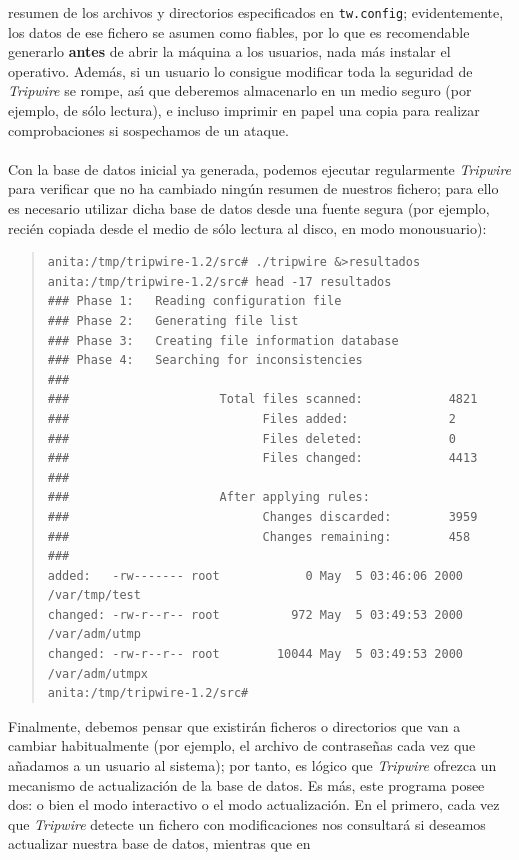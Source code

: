 resumen de los archivos y directorios especificados en {\tt tw.config}; 
evidentemente, los datos de ese fichero se asumen como fiables, por lo que 
es recomendable generarlo {\bf antes} de abrir la m\'aquina a los usuarios,
nada m\'as instalar el operativo. Adem\'as, si un usuario lo consigue modificar
toda la seguridad de {\it Tripwire} se rompe, as\'{\i} que deberemos almacenarlo
en un medio seguro (por ejemplo, de s\'olo lectura), e incluso imprimir en
papel una copia para realizar comprobaciones si sospechamos de un ataque.\\
\\Con la base de datos inicial ya generada, podemos ejecutar regularmente
{\it Tripwire} para verificar que no ha cambiado ning\'un resumen de nuestros
fichero; para ello es necesario utilizar dicha base de datos desde una fuente
segura (por ejemplo, reci\'en copiada desde el medio de s\'olo lectura al
disco, en modo monousuario):
\begin{quote}
\begin{verbatim}
anita:/tmp/tripwire-1.2/src# ./tripwire &>resultados
anita:/tmp/tripwire-1.2/src# head -17 resultados
### Phase 1:   Reading configuration file
### Phase 2:   Generating file list
### Phase 3:   Creating file information database
### Phase 4:   Searching for inconsistencies
###
###                     Total files scanned:            4821
###                           Files added:              2
###                           Files deleted:            0
###                           Files changed:            4413
###
###                     After applying rules:
###                           Changes discarded:        3959
###                           Changes remaining:        458
###
added:   -rw------- root            0 May  5 03:46:06 2000 /var/tmp/test
changed: -rw-r--r-- root          972 May  5 03:49:53 2000 /var/adm/utmp
changed: -rw-r--r-- root        10044 May  5 03:49:53 2000 /var/adm/utmpx
anita:/tmp/tripwire-1.2/src# 
\end{verbatim}
\end{quote}
Finalmente, debemos pensar que existir\'an ficheros o directorios que van a
cambiar habitualmente (por ejemplo, el archivo de contrase\~nas cada vez que
a\~nadamos a un usuario al sistema); por tanto, es l\'ogico que {\it Tripwire}
ofrezca un mecanismo de actualizaci\'on de la base de datos. Es m\'as, este
programa posee dos: o bien el modo interactivo o el modo actualizaci\'on. En
el primero, cada vez que {\it Tripwire} detecte un fichero con modificaciones
nos consultar\'a si deseamos actualizar nuestra base de datos, mientras que en
